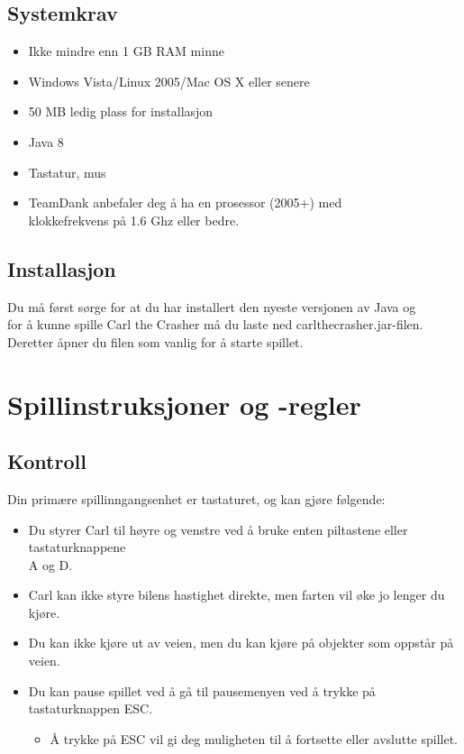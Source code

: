 \documentclass[paper=a4]{article}
\begin{document}
\subsection{Systemkrav}
\begin{itemize}
	\item Ikke mindre enn 1 GB RAM minne\\
	\item Windows Vista/Linux 2005/Mac OS X eller senere \\
	\item 50 MB ledig plass for installasjon \\
	\item Java 8 \\
	\item Tastatur, mus \\
 	\item TeamDank anbefaler deg å ha en prosessor (2005+) med \\ 
klokkefrekvens på 1.6 Ghz eller bedre.
\end{itemize}
\subsection{Installasjon}
Du må først sørge for at du har installert den nyeste versjonen av Java og \\
for å kunne spille Carl the Crasher må du laste ned carlthecrasher.jar-filen. \\
Deretter åpner du filen som vanlig for å starte spillet.   
\newpage

\section{Spillinstruksjoner og -regler} 
\subsection{Kontroll} 
Din primære spillinngangsenhet er tastaturet, og kan gjøre følgende: 
\begin{itemize}
	\item Du styrer Carl til høyre og venstre ved å bruke enten piltastene eller tastaturknappene \\ A og D. 
	\item Carl kan ikke styre bilens hastighet direkte, men farten vil øke jo lenger du kjøre.
	\item Du kan ikke kjøre ut av veien, men du kan kjøre på objekter som oppstår på veien.
	\item Du kan pause spillet ved å gå til pausemenyen ved å trykke på tastaturknappen ESC. 
	\begin{itemize}
		\item Å trykke på ESC vil gi deg muligheten til å fortsette eller avslutte spillet.
	\end{itemize}
\end{itemize}
\end{document}
